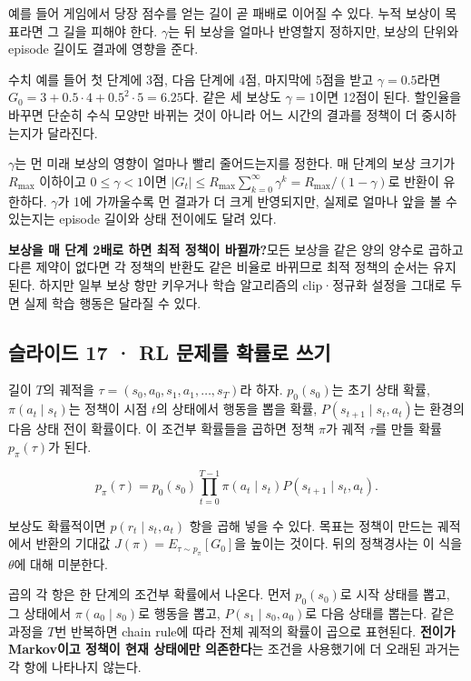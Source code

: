 \documentclass[11pt,a4paper]{article}
\begin{document}
예를 들어 게임에서 당장 점수를 얻는 길이 곧 패배로 이어질 수 있다. 누적 보상이 목표라면 그 길을 피해야 한다. $\gamma$는 뒤 보상을 얼마나 반영할지 정하지만, 보상의 단위와 episode 길이도 결과에 영향을 준다.\par

수치 예를 들어 첫 단계에 3점, 다음 단계에 4점, 마지막에 5점을 받고 $\gamma=0.5$라면 $G_0=3+0.5\cdot4+0.5^2\cdot5=6.25$다. 같은 세 보상도 $\gamma=1$이면 12점이 된다. 할인율을 바꾸면 단순히 수식 모양만 바뀌는 것이 아니라 어느 시간의 결과를 정책이 더 중시하는지가 달라진다.\par

$\gamma$는 먼 미래 보상의 영향이 얼마나 빨리 줄어드는지를 정한다. 매 단계의 보상 크기가 $R_{\max}$ 이하이고 $0\le\gamma<1$이면 $|G_t|\le R_{\max}\sum_{k=0}^{\infty}\gamma^k=R_{\max}/(1-\gamma)$로 반환이 유한하다. $\gamma$가 1에 가까울수록 먼 결과가 더 크게 반영되지만, 실제로 얼마나 앞을 볼 수 있는지는 episode 길이와 상태 전이에도 달려 있다.\par

\par\medskip\noindent\textbf{보상을 매 단계 2배로 하면 최적 정책이 바뀔까?}\quad 모든 보상을 같은 양의 양수로 곱하고 다른 제약이 없다면 각 정책의 반환도 같은 비율로 바뀌므로 최적 정책의 순서는 유지된다. 하지만 일부 보상 항만 키우거나 학습 알고리즘의 clip·정규화 설정을 그대로 두면 실제 학습 행동은 달라질 수 있다.\par

\subsection{슬라이드 17 · RL 문제를 확률로 쓰기}

길이 $T$의 궤적을 $\tau=(s_0,a_0,s_1,a_1,\ldots,s_T)$라 하자. $p_0(s_0)$는 초기 상태 확률, $\pi(a_t\mid s_t)$는 정책이 시점 $t$의 상태에서 행동을 뽑을 확률, $P(s_{t+1}\mid s_t,a_t)$는 환경의 다음 상태 전이 확률이다. 이 조건부 확률들을 곱하면 정책 $\pi$가 궤적 $\tau$를 만들 확률 $p_\pi(\tau)$가 된다.\par

\[
p_\pi(\tau)=p_0(s_0)\prod_{t=0}^{T-1}\pi(a_t\mid s_t)P(s_{t+1}\mid s_t,a_t).
\]

보상도 확률적이면 $p(r_t\mid s_t,a_t)$ 항을 곱해 넣을 수 있다. 목표는 정책이 만드는 궤적에서 반환의 기대값 $J(\pi)=E_{\tau\sim p_\pi}[G_0]$을 높이는 것이다. 뒤의 정책경사는 이 식을 $\theta$에 대해 미분한다.\par

곱의 각 항은 한 단계의 조건부 확률에서 나온다. 먼저 $p_0(s_0)$로 시작 상태를 뽑고, 그 상태에서 $\pi(a_0\mid s_0)$로 행동을 뽑고, $P(s_1\mid s_0,a_0)$로 다음 상태를 뽑는다. 같은 과정을 $T$번 반복하면 chain rule에 따라 전체 궤적의 확률이 곱으로 표현된다. \textbf{전이가 Markov이고 정책이 현재 상태에만 의존한다}는 조건을 사용했기에 더 오래된 과거는 각 항에 나타나지 않는다.\par
\end{document}
